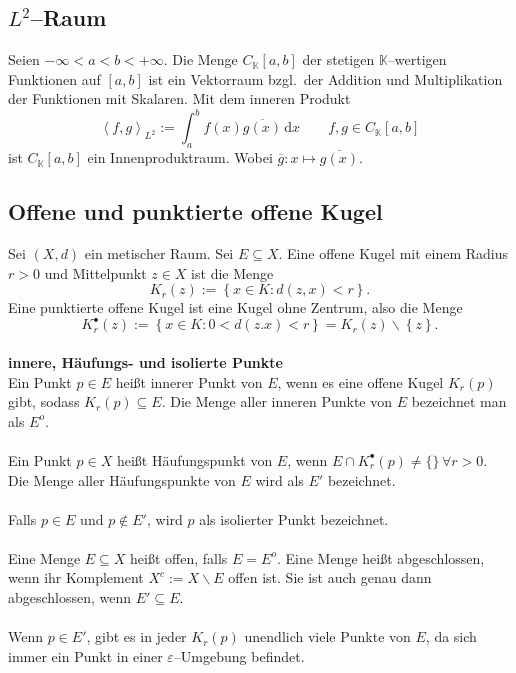 \documentclass[a4paper,12pt]{article}
\newcommand{\td}{\,\text{d}}
\begin{document}
\subsection{$L^2$--Raum}
Seien $-\infty<a<b<+\infty$. Die Menge $C_\mathbb{K}\left[a,b\right]$ der stetigen $\mathbb{K}$--wertigen Funktionen auf $\left[a,b\right]$ ist ein Vektorraum bzgl.\, der Addition und Multiplikation der Funktionen mit Skalaren. Mit dem inneren Produkt
\[ 
        \left\langle f,g\right\rangle _{L^2}:=\int_{a}^{b}f\left(x\right)\overline{g\left(x\right)}\td x\qquad f,g \in C_\mathbb{K}\left[a,b\right]
\] 
ist $C_\mathbb{K}\left[a,b\right]$ ein Innenproduktraum. Wobei $\overline{g}:x\mapsto \overline{g\left(x\right)}$.

\subsection{Offene und punktierte offene Kugel}
Sei $\left(X,d\right)$ ein metischer Raum. Sei $E\subseteq X$. Eine offene Kugel mit einem Radius $r>0$ und Mittelpunkt $z \in X$ ist die Menge
\[ 
        K_r\left(z\right):=\left\{x \in K:d\left(z,x\right)<r\right\}
.\] 
Eine punktierte offene Kugel ist eine Kugel ohne Zentrum, also die Menge
\[ 
        K_r^\bullet \left(z\right):=\left\{x \in K:0<d\left(z.x\right)<r\right\}=K_r\left(z\right)\backslash \left\{z\right\}
.\] 
\hfill\\\textbf{innere, Häufungs- und isolierte Punkte}\\ 
Ein Punkt $p \in E$ heißt innerer Punkt von $E$, wenn es eine offene Kugel $K_r\left(p\right)$ gibt, sodass $K_r\left(p\right)\subseteq E$. Die Menge aller inneren Punkte von $E$ bezeichnet man als $E^o$.\\\\\noindent
Ein Punkt $p \in X$ heißt Häufungspunkt von $E$, wenn $E\cap K_r^{\bullet}\left(p\right)\neq\{\} \,\forall r>0$. Die Menge aller Häufungspunkte von $E$ wird als $E'$ bezeichnet.\\\\\noindent
Falls $p \in E$ und $p \notin E'$, wird $p$ als isolierter Punkt bezeichnet.\\\\\noindent
Eine Menge $E\subseteq X$ heißt offen, falls $E=E^o$. Eine Menge heißt abgeschlossen, wenn ihr Komplement $X^c:=X\backslash E$ offen ist. Sie ist auch genau dann abgeschlossen, wenn $E'\subseteq E$.\\\\\noindent
Wenn $p \in E'$, gibt es in jeder $K_r\left(p\right)$ unendlich viele Punkte von $E$, da sich immer ein Punkt in einer $\varepsilon $--Umgebung befindet.
\end{document}
